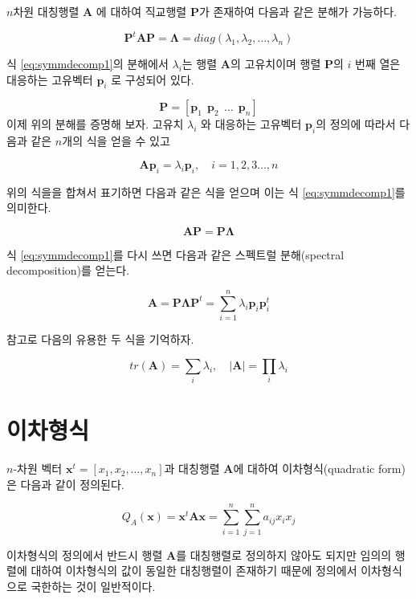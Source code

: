 \documentclass[
]{book}
\theoremstyle{definition}
\theoremstyle{definition}
\theoremstyle{definition}
\theoremstyle{definition}
\theoremstyle{remark}
\begin{document}
\(n\)차원 대칭행렬 \(\bm A\) 에 대하여 직교행렬 \(\bm P\)가 존재하여 다음과 같은 분해가 가능하다.

\begin{equation}
 \bm P^t \bm A \bm P = \bm \Lambda = diag(\lambda_1, \lambda_2, \dots, \lambda_n) 
 \label{eq:symmdecomp1}
\end{equation}

식 \eqref{eq:symmdecomp1}의 분해에서 \(\lambda_i\)는 행렬 \(\bm A\)의 고유치이며 행렬 \(\bm P\)의 \(i\) 번째 열은 대응하는 고유벡터 \(\bm p_i\) 로 구성되어 있다.

\[ \bm P = [ \bm p_1~~ \bm p_2 ~~ \dots ~~ \bm p_n ] \]
이제 위의 분해를 증명해 보자. 고유치 \(\lambda_i\) 와 대응하는 고유벡터 \(\bm p_i\)의 정의에 따라서 다음과 같은 \(n\)개의 식을 얻을 수 있고

\[ \bm A \bm p_i = \lambda_i \bm p_i , \quad i=1,2,3\dots, n \]

위의 식을을 합쳐서 표기하면 다음과 같은 식을 얻으며 이는 식 \eqref{eq:symmdecomp1}를 의미한다.

\[ \bm A \bm P = \bm P \bm \Lambda \]

식 \eqref{eq:symmdecomp1}를 다시 쓰면 다음과 같은 스펙트럴 분해(spectral decomposition)를 얻는다.

\begin{equation}
 \bm A  = \bm P \bm \Lambda \bm P^t  = \sum_{i=1}^n \lambda_i \bm p_i \bm {p}_i^t 
 \label{eq:spectral}
\end{equation}

참고로 다음의 유용한 두 식을 기억하자.

\[ tr(\bm A) = \sum_i \lambda_i ,\quad |\bm A| = \prod_i \lambda_i \]

\hypertarget{uxc774uxcc28uxd615uxc2dd}{%
\section{이차형식}\label{uxc774uxcc28uxd615uxc2dd}}

\(n\)-차원 벡터 \(\bm x^t=[x_1,x_2,\dots,x_n]\)과 대칭행렬 \(\bm A\)에 대하여 이차형식(quadratic form)은 다음과 같이 정의된다.

\begin{equation}
Q_A(\bm x) = \bm x^t \bm A \bm x =\sum_{i=1}^n \sum_{j=1}^n a_{ij} x_i x_j 
\label{eq:quadratic}
\end{equation}

이차형식의 정의에서 반드시 행렬 \(\bm A\)를 대칭행렬로 정의하지 않아도 되지만 임의의 행렬에 대하여 이차형식의 값이 동일한 대칭행렬이 존재하기 때문에 정의에서 이차형식으로 국한하는 것이 일반적이다.
\end{document}
